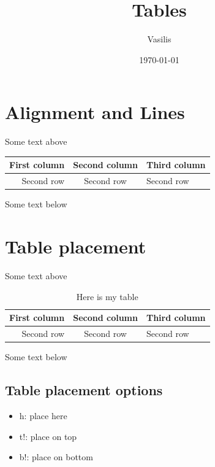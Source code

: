 \documentclass{article}
\title{Tables}
\author{Vasilis}
\date{\today}
\begin{document}
\maketitle

\section{Alignment and Lines}
Some text above
\begin{tabular}{|r|c|l|}
	First column & Second column & Third column \\ \hline\hline
	Second row & Second row & Second row
\end{tabular}
Some text below

\section{Table placement}
Some text above
\begin{table}[h]
\centering
\begin{tabular}{|r|c|l|}
	First column & Second column & Third column \\ \hline\hline
	Second row & Second row & Second row
\end{tabular}
\caption{Here is my table}
\end{table}

Some text below

\subsection{Table placement options}

\begin{itemize}
	\item h: place here
	\item t!: place on top
	\item b!: place on bottom
\end{itemize}
\end{document}
